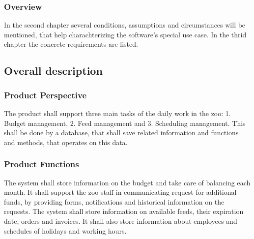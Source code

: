	\subsubsection{Overview}
		In the second chapter several conditions, assumptions and circumstances will be mentioned, that help charachterizing the software's special use case. In the thrid chapter the concrete requirements are listed.
		\newpage
\subsection{Overall description}

	\subsubsection{Product Perspective}
		The product shall support three main tasks of the daily work in the zoo: 1. Budget management, 2. Feed management and 3. Scheduling management. This shall be done by a database, that shall save related information and functions and methods, that operates on this data.

	\subsubsection{Product Functions}
		The system shall store information on the budget and take care of balancing each month. It shall support the zoo staff in communicating request for additional funds, by providing forms, notifications and historical information on the requests. The system shall store information on available feeds, their expiration date, orders and invoices. It shall also store information about employees and schedules of holidays and working hours.

